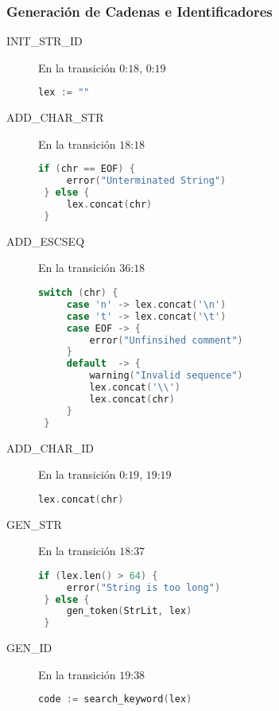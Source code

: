 \documentclass[a4paper]{CSMakotoTechnicalReport}
\begin{document}
\begin{minipage}{\textwidth}
\begin{multicols}{2}
\begin{description}
    \end{description}
    \end{multicols}

    \subsubsection{Generación de Cadenas e Identificadores}

    \begin{multicols}{2}
    \begin{description}

        \item[INIT\_STR\_ID] En la transición $0$:$18$, $0$:$19$
            \begin{lstlisting}[language=C]
 lex := ""
            \end{lstlisting}

        \item[ADD\_CHAR\_STR] En la transición $18$:$18$
            \begin{lstlisting}[language=C]
 if (chr == EOF) {
     error("Unterminated String")
 } else {
     lex.concat(chr)
 }
            \end{lstlisting}

        \item[ADD\_ESCSEQ] En la transición $36$:$18$
            \begin{lstlisting}[language=C]
 switch (chr) {
     case 'n' -> lex.concat('\n')
     case 't' -> lex.concat('\t')
     case EOF -> {
         error("Unfinsihed comment")
     }
     default  -> {
         warning("Invalid sequence")
         lex.concat('\\')
         lex.concat(chr)
     }
 }
            \end{lstlisting}

        \columnbreak

        \item[ADD\_CHAR\_ID] En la transición $0$:$19$, $19$:$19$
            \begin{lstlisting}[language=C]
 lex.concat(chr)
            \end{lstlisting}
        \item[GEN\_STR] En la transición $18$:$37$
            \begin{lstlisting}[language=C]
 if (lex.len() > 64) {
     error("String is too long")
 } else {
     gen_token(StrLit, lex)
 }
            \end{lstlisting}

        \item[GEN\_ID] En la transición $19$:$38$
            \begin{lstlisting}[language=C]
 code := search_keyword(lex)


\end{lstlisting}
\end{description}
\end{multicols}
\end{minipage}
\end{document}

